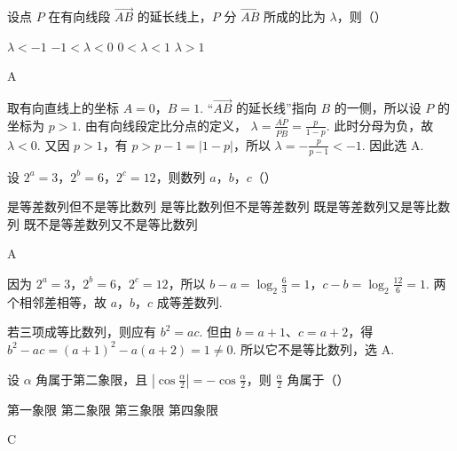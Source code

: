 \begin{problem}
设点 \(P\) 在有向线段 \(\overrightarrow{AB}\) 的延长线上，\(P\) 分 \(\overrightarrow{AB}\) 所成的比为 \(\lambda\)，则（\quad）

\choices
    {\(\lambda<-1\)}
    {\(-1<\lambda<0\)}
    {\(0<\lambda<1\)}
    {\(\lambda>1\)}
\end{problem}

\begin{answer}
A
\end{answer}

\begin{solution}
取有向直线上的坐标 \(A=0\)，\(B=1\). “\(\overrightarrow{AB}\) 的延长线”指向 \(B\) 的一侧，所以设 \(P\) 的坐标为 \(p>1\). 由有向线段定比分点的定义，
\(\lambda=\frac{\overline{AP}}{\overline{PB}}=\frac{p}{1-p}\). 此时分母为负，故 \(\lambda<0\). 又因 \(p>1\)，有 \(p>p-1=|1-p|\)，所以
\(\lambda=-\frac{p}{p-1}<-1\). 因此选 A.
\end{solution}

\begin{problem}
设 \(2^a=3\)，\(2^b=6\)，\(2^c=12\)，则数列 \(a\)，\(b\)，\(c\)（\quad）

\choices
    {是等差数列但不是等比数列}
    {是等比数列但不是等差数列}
    {既是等差数列又是等比数列}
    {既不是等差数列又不是等比数列}
\end{problem}

\begin{answer}
A
\end{answer}

\begin{solution}
因为 \(2^a=3\)，\(2^b=6\)，\(2^c=12\)，所以
\(b-a=\log_2\frac{6}{3}=1\)，\(c-b=\log_2\frac{12}{6}=1\). 两个相邻差相等，故 \(a\)，\(b\)，\(c\) 成等差数列.

若三项成等比数列，则应有 \(b^2=ac\). 但由 \(b=a+1\)、\(c=a+2\)，得 \(b^2-ac=(a+1)^2-a(a+2)=1\ne0\). 所以它不是等比数列，选 A.
\end{solution}

\begin{problem}
设 \(\alpha\) 角属于第二象限，且 \(\left|\cos\frac{\alpha}{2}\right|=-\cos\frac{\alpha}{2}\)，则 \(\frac{\alpha}{2}\) 角属于（\quad）

\choices
    {第一象限}
    {第二象限}
    {第三象限}
    {第四象限}
\end{problem}

\begin{answer}
C
\end{answer}

